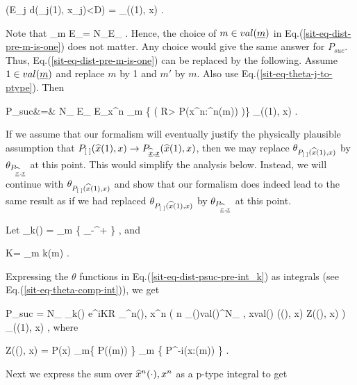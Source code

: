 \beq
\theta(E_j d(_j(1), x_j)<D)
=
\theta_{\ptype{\;}((1), x)}
\;.
\label{sit-eq-theta-j-to-ptype}
\eeq

Note that
\beq
\sum_m E_{\what{\calc}}=
N_\rvm E_{\what{\calc}}
\;.
\eeq
Hence, the choice of $m\in val(\rvm)$
in Eq.(\ref{sit-eq-dist-pre-m-is-one})
does not matter. Any choice would
give the same answer for $P_{suc}$.
Thus,
Eq.(\ref{sit-eq-dist-pre-m-is-one})
can be replaced by
the following.
Assume
$1\in val(\rvm)$
and replace
$m$ by 1 and $m'$ by $m$.
Also use
Eq.(\ref{sit-eq-theta-j-to-ptype}).
Then


\beqa
P_{suc}&=&
N_\rvm
E_{\what{\calc}}
E_{x^n}
\prod_{m}
\left\{
\theta\left(
R> 
\ln
{}
{P(x^n:^n(m))}
\right)\right\}
\theta_{\ptype{\;}((1), x)}
\;.
\label{sit-eq-dist-psuc-pre-int_k}
\eeqa



If we assume that
our formalism will eventually
justify the physically plausible assumption
that
$\ptype{\;}(\what{x}(1), x)\rarrow
P_{\what{\rvx},\rvx}(\what{x}(1), x)$,
then we may replace
$\theta_{{P_{[\;]} }({\widehat{x}}(1), x)}$
by $\theta_{P_{\what{\rvx}, \rvx}}$
at this point. This would
simplify the analysis below.
Instead, we will
continue with
$\theta_{{P_{[\;]} }({\widehat{x}}(1), x)}$
and show that
our formalism does indeed
lead to the same result
as if we had
replaced
$\theta_{{P_{[\;]} }({\widehat{x}}(1), x)}$
by $\theta_{P_{\what{\rvx}, \rvx}}$ at this point.



Let
\beq
\oint_{k(\cdot)} =
\prod_{m}
\left\{
\int_{-\infty}^{+\infty}
\;\;
\right\}
\;,
\eeq
and

\beq
K= \sum_{m} k(m)
\;.
\eeq

Expressing the $\theta$
functions in Eq.(\ref{sit-eq-dist-psuc-pre-int_k})
 as
integrals (see Eq.(\ref{sit-eq-theta-comp-int})),
we get


\beq
P_{suc} = N_\rvm
\oint_{k(\cdot)}
e^{iKR}
\sum_{^n(\cdot), x^n}
\exp\left(
n \sum_{(\cdot)\in val(\rvx)^{N_\rvm}
\;,\; x\in val(\rvx)}
\ptype{\;}((\cdot), x)
\ln Z((\cdot), x)
\right)
\theta_{\ptype{\;}((1), x)}
\;,
\eeq
where

\beq
Z((\cdot), x)
=
P(x)
\prod_m\left\{
P((m))
\right\}
\prod_{m}
\left\{
{P^{-i}(x:(m))}
\right\}
\;.
\eeq

Next we express the sum over ${\widehat{x}}^n(\cdot), x^n$
as a p-type integral to get


